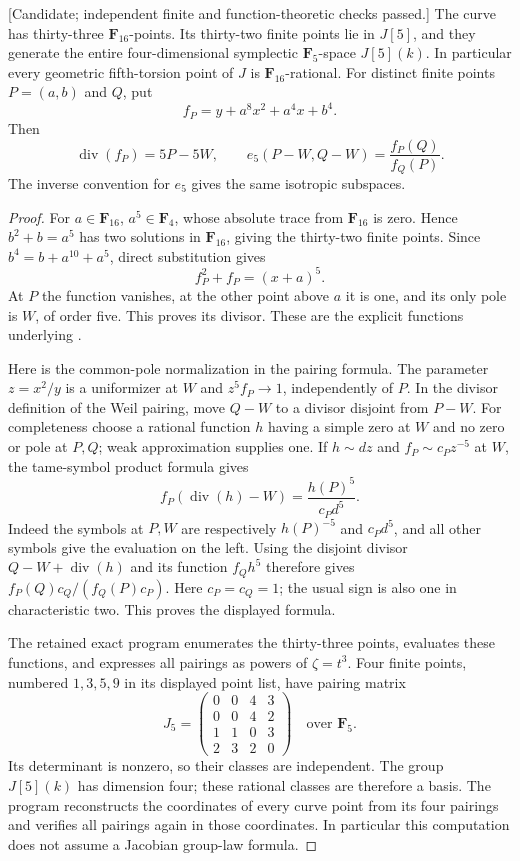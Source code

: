 \begin{lemma}
\label{lem:five-theta-explicit-Weil-candidate}
\textup{[Candidate; independent finite and function-theoretic checks passed.]}
The curve has thirty-three $\mathbf F_{16}$-points. Its thirty-two
finite points lie in $J[5]$, and they generate the entire four-dimensional
symplectic $\mathbf F_5$-space $J[5](k)$. In particular every geometric
fifth-torsion point of $J$ is $\mathbf F_{16}$-rational.
For distinct finite points $P=(a,b)$ and $Q$, put
\[
             f_P=y+a^8x^2+a^4x+b^4.
\]
Then
\[
 \operatorname{div}(f_P)=5P-5W,\qquad
 e_5(P-W,Q-W)=\frac{f_P(Q)}{f_Q(P)}.
\]
The inverse convention for $e_5$ gives the same isotropic subspaces.
\end{lemma}
\begin{proof}
For $a\in\mathbf F_{16}$, $a^5\in\mathbf F_4$, whose absolute trace
from $\mathbf F_{16}$ is zero. Hence $b^2+b=a^5$ has two solutions
in $\mathbf F_{16}$, giving the thirty-two finite points.
Since $b^4=b+a^{10}+a^5$, direct substitution gives
\[
                      f_P^2+f_P=(x+a)^5.
\]
At $P$ the function vanishes, at the other point above $a$ it is one,
and its only pole is $W$, of order five. This proves its divisor.
These are the explicit functions underlying
\cite[Example~1.2(ii), pp.~30--31]{BoxallGrantLeprevost2001}.

Here is the common-pole normalization in the pairing formula.
The parameter $z=x^2/y$ is a uniformizer at $W$ and
$z^5 f_P\to1$, independently of $P$. In the divisor definition of
the Weil pairing, move $Q-W$ to a divisor disjoint from $P-W$.
For completeness choose a rational function $h$ having a simple zero
at $W$ and no zero or pole at $P,Q$; weak approximation supplies one.
If $h\sim d z$ and $f_P\sim c_Pz^{-5}$ at $W$, the tame-symbol
product formula gives
\[
           f_P(\operatorname{div}(h)-W)
                   =\frac{h(P)^5}{c_Pd^5}.
\]
Indeed the symbols at $P,W$ are respectively $h(P)^{-5}$ and
$c_Pd^5$, and all other symbols give the evaluation on the left.
Using the disjoint divisor $Q-W+\operatorname{div}(h)$ and its
function $f_Qh^5$ therefore gives
$f_P(Q)c_Q/(f_Q(P)c_P)$. Here $c_P=c_Q=1$; the usual sign is also
one in characteristic two. This proves the displayed formula.

The retained exact program enumerates the thirty-three points,
evaluates these functions, and expresses all pairings as powers of
$\zeta=t^3$. Four finite points, numbered $1,3,5,9$ in its displayed
point list, have pairing matrix
\[
 J_5=\begin{pmatrix}
 0&0&4&3\\0&0&4&2\\1&1&0&3\\2&3&2&0
 \end{pmatrix}\quad\text{over }\mathbf F_5.
\]
Its determinant is nonzero, so their classes are independent.
The group $J[5](k)$ has dimension four; these rational classes are
therefore a basis. The program reconstructs the coordinates of
every curve point from its four pairings and verifies all pairings
again in those coordinates. In particular this computation does
not assume a Jacobian group-law formula.
\end{proof}

